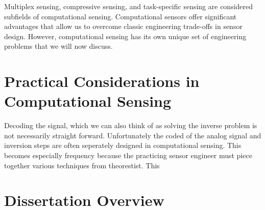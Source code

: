 Multiplex sensing, compressive sensing, and task-specific sensing are considered subfields of computational sensing. Computational sensors offer significant advantages that allow us to overcome classic engineering trade-offs in sensor design. However, computational sensing has its own unique set of engineering problems that we will now discuss.

\section{Practical Considerations in Computational Sensing}

Decoding the signal, which we can also think of as solving the inverse problem is not necessarily straight forward. Unfortunately the coded of the analog signal and inversion steps are often seperately designed in computational sensing. This becomes especially frequency because the practicing sensor engineer must piece together various techniques from theorestist. This 

\section{Dissertation Overview}



%  
%

